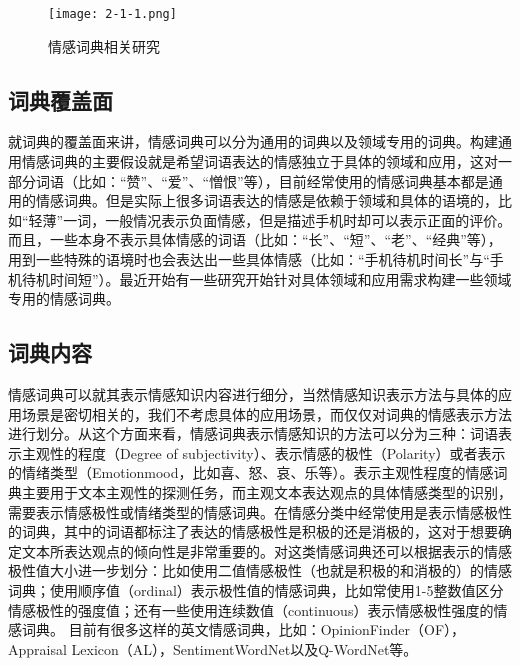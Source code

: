 \begin{figure}[htp]
\centering
\texttt{[image: 2-1-1.png]}
\caption{情感词典相关研究}
\label{fig2-1-1}
\end{figure}

\subsection{词典覆盖面}
就词典的覆盖面来讲，情感词典可以分为通用的词典以及领域专用的词典。构建通用情感词典的主要假设就是希望词语表达的情感独立于具体的领域和应用，这对一部分词语（比如：“赞”、“爱”、“憎恨”等），目前经常使用的情感词典基本都是通用的情感词典。但是实际上很多词语表达的情感是依赖于领域和具体的语境的，比如“轻薄”一词，一般情况表示负面情感，但是描述手机时却可以表示正面的评价。而且，一些本身不表示具体情感的词语（比如：“长”、“短”、“老”、“经典”等），用到一些特殊的语境时也会表达出一些具体情感（比如：“手机待机时间长”与“手机待机时间短”）。最近开始有一些研究开始针对具体领域和应用需求构建一些领域专用的情感词典。

\subsection{词典内容}
情感词典可以就其表示情感知识内容进行细分，当然情感知识表示方法与具体的应用场景是密切相关的，我们不考虑具体的应用场景，而仅仅对词典的情感表示方法进行划分。从这个方面来看，情感词典表示情感知识的方法可以分为三种：词语表示主观性的程度（Degree of subjectivity）、表示情感的极性（Polarity）或者表示的情绪类型（Emotion\/mood，比如喜、怒、哀、乐等）。表示主观性程度的情感词典主要用于文本主观性的探测任务，而主观文本表达观点的具体情感类型的识别，需要表示情感极性或情绪类型的情感词典。在情感分类中经常使用是表示情感极性的词典，其中的词语都标注了表达的情感极性是积极的还是消极的，这对于想要确定文本所表达观点的倾向性是非常重要的。对这类情感词典还可以根据表示的情感极性值大小进一步划分：比如使用二值情感极性（也就是积极的和消极的）的情感词典；使用顺序值（ordinal）表示极性值的情感词典，比如常使用1-5整数值区分情感极性的强度值；还有一些使用连续数值（continuous）表示情感极性强度的情感词典。
目前有很多这样的英文情感词典，比如：OpinionFinder（OF），Appraisal Lexicon（AL），SentimentWordNet以及Q-WordNet等。

